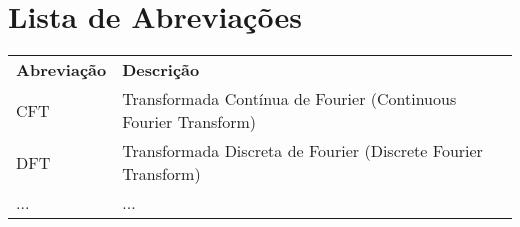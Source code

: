 \chapter*{Lista de Abreviações} 

\begin{longtable}[l]{l l} 
   \textbf{Abreviação}	& \textbf{Descrição} \\
   
   CFT & Transformada Contínua de Fourier (Continuous Fourier Transform) \\
   DFT & Transformada Discreta de Fourier (Discrete Fourier Transform) \\
   ... & ... \\ 
\end{longtable}
